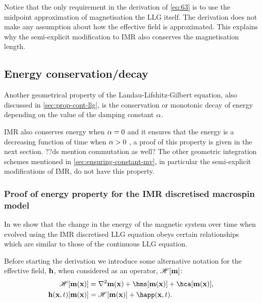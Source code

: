 Notice that the only requirement in the derivation of \cref{eq:63} is to use the midpoint approximation of magnetisation the LLG itself.
The derivation does not make any assumption about how the effective field is approximated.
This explains why the semi-explicit modification to IMR also conserves the magnetisation length.


\subsection{Energy conservation/decay}
\label{sec:energy-cons}

Another geometrical property of the Landau-Lifshitz-Gilbert equation, also discussed in \cref{sec:prop-cont-llg}, is the conservation or monotonic decay of energy depending on the value of the damping constant $\alpha$.

IMR also conserves energy when $\alpha = 0$ and it ensures that the energy is a decreasing function of time when $\alpha > 0$ \cite{DAquino2005}, a proof of this property is given in the next section.
??ds mention commutation as well?
The other geometric integration schemes mentioned in \cref{sec:ensuring-constant-mv}, in particular the semi-explicit modifications of IMR, do not have this property.


\subsubsection{Proof of energy property for the IMR discretised macrospin model}
\label{sec:proof-energy-prop}

\newcommand{\happerror}{\mathcal{E}_\text{ap}}

In  we show that the change in the energy of the magnetic system over time when evolved using the IMR discretised LLG equation obeys certain relationships which are similar to those of the continuous LLG equation.

Before starting the derivation we introduce some alternative notation for the effective field, $\boldsymbol{\mathrm{h}}$, when considered as an operator, $\mathscr{H} {\left[ \boldsymbol{\mathrm{m}} \right]}$:
\begin{equation}
  \begin{aligned}
    \label{eq:hop}
    \hopb{\mv(\xv)} &= \lap \mv(\xv) + \hms[\mv(\xv)] + \hca[\mv(\xv)], \\
    \hv(\xv, t)[\mv(\xv)] &= \hopb{\mv(\xv)} + \happ(\xv, t). \\
  \end{aligned}
\end{equation}

